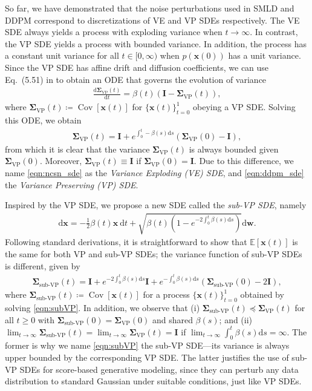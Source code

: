 \documentclass{article} %
\newcommand{\mbf}[1]{\mathbf{#1}}
\newcommand{\mbb}[1]{\mathbb{#1}}
\newcommand{\ud}{\mathrm{d}}
\newcommand{\bfx}{\mathbf{x}}
\newcommand{\bfw}{\mathbf{w}}
\newcommand{\bfI}{\mathbf{I}}
\newcommand{\bfsigma}{\mbf{\Sigma}}
\begin{document}
So far, we have demonstrated that the noise perturbations used in SMLD and DDPM correspond to discretizations of VE and VP SDEs respectively. The VE SDE always yields a process with exploding variance when $t \to \infty$. In contrast, the VP SDE yields a process with bounded variance. In addition, the process has a constant unit variance for all $t \in [0, \infty)$ when $p(\bfx(0))$ has a unit variance. Since the VP SDE has affine drift and diffusion coefficients, we can use Eq.~(5.51) in \citet{sarkka2019applied} to obtain an ODE that governs the evolution of variance
\begin{align*}
    \frac{\ud \bfsigma_\text{VP}(t)}{\ud t} = \beta(t) (\bfI - \bfsigma_\text{VP}(t)),
\end{align*}
where $\bfsigma_\text{VP}(t) \coloneqq \operatorname{Cov}[\bfx(t)]$ for $\{\bfx(t)\}_{t=0}^1$ obeying a VP SDE. Solving this ODE, we obtain
\begin{align}
    \bfsigma_\text{VP}(t) = \bfI + e^{\int_0^t - \beta(s) \ud s}(\bfsigma_\text{VP}(0) - \bfI),
\end{align}
from which it is clear that the variance $\bfsigma_\text{VP}(t)$ is always bounded given $\bfsigma_\text{VP}(0)$. Moreover, $\bfsigma_\text{VP}(t) \equiv \bfI$ if $\bfsigma_\text{VP}(0) = \bfI$. Due to this difference, we name \cref{eqn:ncsn_sde} as the \emph{Variance Exploding (VE) SDE}, and \cref{eqn:ddpm_sde} the \emph{Variance Preserving (VP) SDE}.

Inspired by the VP SDE, we propose a new SDE called the \emph{sub-VP SDE}, namely
\begin{align}
    \ud \bfx = -\frac{1}{2}\beta(t) \bfx~ \ud t + \sqrt{\beta(t)(1 - e^{-2\int_0^t \beta(s)\ud s})} \ud \bfw.\label{eqn:subVP}
\end{align}
Following standard derivations, it is straightforward to show that $\mbb{E}[\bfx(t)]$ is the same for both VP and sub-VP SDEs; the variance function of sub-VP SDEs is different, given by
\begin{align}
    \bfsigma_\text{sub-VP}(t) = \bfI + e^{-2 \int_{0}^t \beta(s)\ud s} \bfI + e^{-\int_0^t \beta(s) \ud s}(\bfsigma_\text{sub-VP}(0) - 2\bfI),
\end{align}
where $\bfsigma_\text{sub-VP}(t) \coloneqq \operatorname{Cov}[\bfx(t)]$ for a process $\{\bfx(t)\}_{t=0}^1$ obtained by solving \cref{eqn:subVP}. In addition, we observe that (i) $\bfsigma_{\text{sub-VP}}(t) \preccurlyeq \bfsigma_{\text{VP}}(t)$ for all $t \geq 0$ with $\bfsigma_\text{sub-VP}(0) = \bfsigma_\text{VP}(0)$ and shared $\beta(s)$; and (ii) $\lim_{t\to \infty} \bfsigma_{\text{sub-VP}}(t) = \lim_{t \to \infty}\bfsigma_{\text{VP}}(t) = \bfI$ if $\lim_{t\to \infty}\int_0^t \beta(s) \ud s = \infty$. The former is why we name \cref{eqn:subVP} the sub-VP SDE---its variance is always upper bounded by the corresponding VP SDE. The latter justifies the use of sub-VP SDEs for score-based generative modeling, since they can perturb any data distribution to standard Gaussian under suitable conditions, just like VP SDEs.
\end{document}

